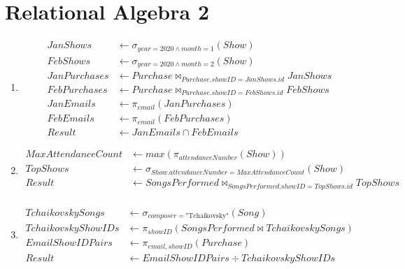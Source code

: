 \documentclass{article}
\begin{document}
\section*{Relational Algebra 2}
\begin{enumerate}
    \item
          \[
              \begin{aligned}
                  JanShows     & \leftarrow \sigma_{year = 2020 \wedge month = 1}(Show)               \\
                  FebShows     & \leftarrow \sigma_{year = 2020 \wedge month = 2}(Show)               \\
                  JanPurchases & \leftarrow Purchase \bowtie_{Purchase.showID = JanShows.id} JanShows \\
                  FebPurchases & \leftarrow Purchase \bowtie_{Purchase.showID = FebShows.id} FebShows \\
                  JanEmails    & \leftarrow \pi_{email}(JanPurchases)                                 \\
                  FebEmails    & \leftarrow \pi_{email}(FebPurchases)                                 \\
                  Result       & \leftarrow JanEmails \cap FebEmails
              \end{aligned}
          \]

    \item
          \[
              \begin{aligned}
                  MaxAttendanceCount & \leftarrow max(\pi_{attendanceNumber}(Show))                                     \\
                  TopShows           & \leftarrow \sigma_{Show.attendanceNumber = MaxAttendanceCount} (Show)            \\
                  Result             & \leftarrow SongsPerformed \bowtie_{SongsPerformed.showID = TopShows.id} TopShows \\
              \end{aligned}
          \]

    \item
          \[
              \begin{aligned}
                  TchaikovskySongs   & \leftarrow \sigma_{composer = \text{"Tchaikovsky"}}(Song)        \\
                  TchaikovskyShowIDs & \leftarrow \pi_{showID}(SongsPerformed \bowtie TchaikovskySongs) \\
                  EmailShowIDPairs   & \leftarrow \pi_{email, showID}(Purchase)                         \\
                  Result             & \leftarrow EmailShowIDPairs \div TchaikovskyShowIDs
              \end{aligned}
          \]
\end{enumerate}
\end{document}
